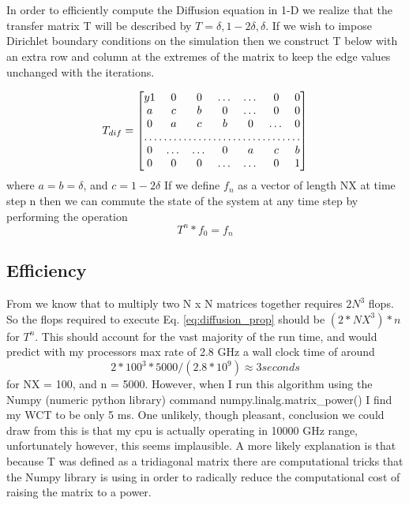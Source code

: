\documentclass[]{article}
\begin{document}
\section{}

In order to efficiently compute the Diffusion equation in 1-D we realize that the transfer matrix T will be described by $T= {\delta, 1-2\delta, \delta}$. If we wish to impose Dirichlet boundary conditions on the simulation then we construct T below with an extra row and column at the extremes of the matrix to keep the edge values unchanged with the iterations.

\begin{equation}
T_{dif}=\begin{bmatrix}y 
1       & 0 & 0 &\dots& \dots &0&0 \\
a      & c & b & 0&\dots & 0 &0\\
0& a & c & b & 0 &\dots & 0 \\
\hdotsfor{7} \\
0 &\dots & \dots & 0&a & c & b  \\
0     &0  & 0 & \dots&\dots & 0&1
\end{bmatrix}
\label{eq:T_Diffusion}
\end{equation}
where $a = b =\delta$, and $c=1-2\delta$
If we define $f_n$ as a vector of length NX at time step n then we can commute the state of the system at any time step by performing the operation
\begin{equation}
T^n * f_0 = f_n
\label{eq:diffusion_prop}
\end{equation}


\subsection{Efficiency}
From \cite{matrix_flops} we know that to multiply two N x N matrices together requires $2N^3$ flops. So the flops required to execute Eq. \ref{eq:diffusion_prop} should be $(2*NX^3)*n$ for $T^n$. This should account for the vast majority of the run time, and would predict with my processors max rate of 2.8 GHz a wall clock time of around 
\begin{equation}
	2*100^3*5000 / (2.8 * 10^9) \approx 3 seconds
\end{equation}
for NX = 100, and n = 5000. However, when I run this algorithm using the Numpy (numeric python library) command numpy.linalg.matrix\_power() I find my WCT to be only 5 ms. One unlikely, though pleasant, conclusion we could draw from this is that my cpu is actually operating in 10000 GHz range, unfortunately however, this seems implausible. A more likely explanation is that because T was defined as a tridiagonal matrix there are computational tricks that the Numpy library is using in order to radically reduce the computational cost of raising the matrix to a power. 
\end{document}
